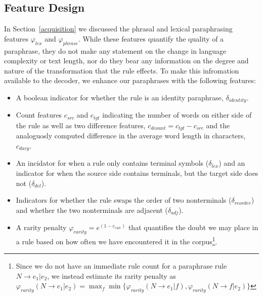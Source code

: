\documentclass[11pt]{article}
\begin{document}
\subsection{Feature Design}
In Section~\ref{acquisition} we discussed the phrasal and lexical
paraphrasing features $\varphi_{\mathit{lex}}$ and
$\varphi_{\mathit{phrase}}$. While these features quantify the quality
of a paraphrase, they do not make any statement on the change in
language complexity or text length, nor do they bear any information
on the degree and nature of the transformation that the rule
effects. To make this infromation available to the decoder, we enhance
our paraphrases with the following features:
\begin{itemize}
\item A boolean indicator for whether the rule is an identity
  paraphrase, $\delta_{\mathit{identity}}$.

\item Count features $c_{\mathit{src}}$ and $c_{\mathit{tgt}}$
  indicating the number of words on either side of the rule as well as
  two difference features, $c_{\mathit{dcount}} = c_{\mathit{tgt}} -
  c_{\mathit{src}}$ and the analoguosly computed difference in the
  average word length in characters, $c_{\mathit{davg}}$.

\item An incidator for when a rule only contains terminal symbols
  ($\delta_{\mathit{lex}}$) and an indicator for when the source side
  contains terminals, but the target side does not
  ($\delta_{\mathit{del}}$).

\item Indicators for whether the rule swaps the order of two
  nonterminals ($\delta_{\mathit{reorder}}$) and whether the two
  nonterminals are adjacent ($\delta_{\mathit{adj}}$).

\item A rarity penalty $\varphi_{\mathit{rarity}} =
  e^{(1-c_{\mathit{rule}})}$ that quantifies the doubt we may place in
  a rule based on how often we have encountered it in the
  corpus\footnote{Since we do not have an immediate rule count for a
    paraphrase rule $N \rightarrow e_1 | e_2$, we instead estimate
    its rarity penalty as $\varphi_{\mathit{rarity}}(N
    \rightarrow e_1 | e_2) = \max_{f} \min
    \{\varphi_{\mathit{rarity}}(N \rightarrow e_1 | f),
    \varphi_{\mathit{rarity}}(N \rightarrow f | e_2) \}$}.
\end{itemize}
\end{document}
